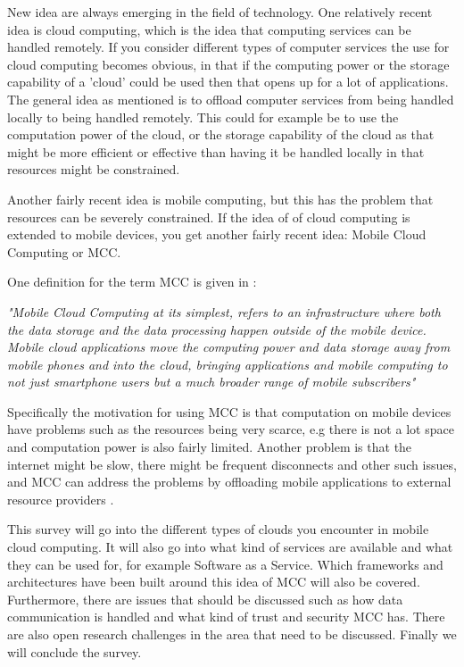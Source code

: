 
New idea are always emerging in the field of technology.
One relatively recent idea is cloud computing, which is the idea that computing services can be handled remotely.
If you consider different types of computer services the use for cloud computing becomes obvious, in that if the computing power or the storage capability of a 'cloud' could be used then that opens up for a lot of applications.
The general idea as mentioned is to offload computer services from being handled locally to being handled remotely. 
This could for example be to use the computation power of the cloud, or the storage capability of the cloud as that might be more efficient or effective than having it be handled locally in that resources might be constrained.

Another fairly recent idea is mobile computing, but this has the problem that resources can be severely constrained. 
If the idea of of cloud computing is extended to mobile devices, you get another fairly recent idea: Mobile Cloud Computing or MCC.

One definition for the term MCC is given in \citet{}:

\textit{"Mobile Cloud Computing at its simplest, refers to an infrastructure where both the data storage and the data processing happen outside of the mobile device. Mobile cloud applications move the computing power and data storage away from mobile phones and into the cloud, bringing applications and mobile computing to not just smartphone users but a much broader range of mobile subscribers"}

Specifically the motivation for using MCC is that computation on mobile devices have problems such as the resources being very scarce, e.g there is not a lot space and computation power is also fairly limited. Another problem is that the internet might be slow, there might be frequent disconnects and other such issues, and MCC can address the problems by offloading mobile applications to external resource providers \citet{}.

This survey will go into the different types of clouds you encounter in mobile cloud computing.
It will also go into what kind of services are available and what they can be used for, for example Software as a Service.
Which frameworks and architectures have been built around this idea of MCC will also be covered. 
Furthermore, there are issues that should be discussed such as how data communication is handled and what kind of trust and security MCC has. 
There are also open research challenges in the area that need to be discussed. 
Finally we will conclude the survey.
